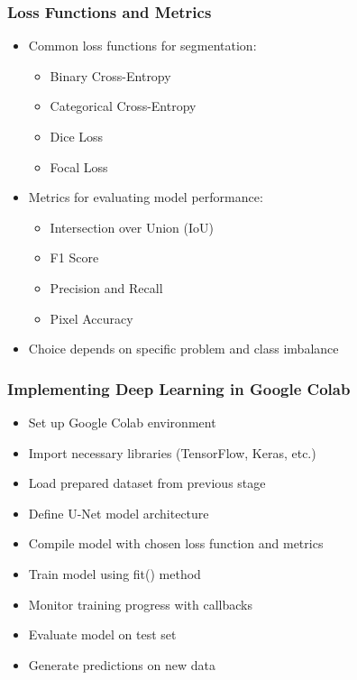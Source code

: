 \begin{frame}[fragile]\frametitle{Loss Functions and Metrics}
\begin{itemize}
\item Common loss functions for segmentation:
  \begin{itemize}
  \item Binary Cross-Entropy
  \item Categorical Cross-Entropy
  \item Dice Loss
  \item Focal Loss
  \end{itemize}
\item Metrics for evaluating model performance:
  \begin{itemize}
  \item Intersection over Union (IoU)
  \item F1 Score
  \item Precision and Recall
  \item Pixel Accuracy
  \end{itemize}
\item Choice depends on specific problem and class imbalance
\end{itemize}
\end{frame}

\begin{frame}[fragile]\frametitle{Implementing Deep Learning in Google Colab}
\begin{itemize}
\item Set up Google Colab environment
\item Import necessary libraries (TensorFlow, Keras, etc.)
\item Load prepared dataset from previous stage
\item Define U-Net model architecture
\item Compile model with chosen loss function and metrics
\item Train model using fit() method
\item Monitor training progress with callbacks
\item Evaluate model on test set
\item Generate predictions on new data
\end{itemize}
\end{frame}

